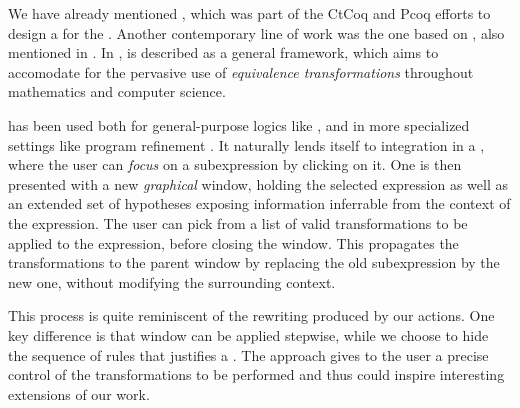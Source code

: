 \begin{scope}
We have already mentioned , which was part of the CtCoq and
Pcoq efforts  to design a  for the  . Another contemporary line of work was the
one based on \emph{}, also mentioned in . In
,  is described as a general
 framework, which aims to accomodate for the pervasive use of
\emph{equivalence transformations} throughout mathematics and computer science.

 has been used both for general-purpose logics like 
, and in more specialized settings like program
refinement . It naturally lends itself to
integration in a 
, where the user can
\emph{focus} on a subexpression by clicking on it. One is then presented with a
new \emph{graphical} window, holding the selected expression as well as an
extended set of hypotheses exposing information inferrable from the context of
the expression. The user can pick from a list of valid transformations to be
applied to the expression, before closing the window. This propagates the
transformations to the parent window by replacing the old subexpression by the
new one, without modifying the surrounding context.

This process is quite reminiscent of the rewriting produced by our 
actions. One key difference is that window  can be
applied stepwise, while we choose to hide the sequence of rules that
justifies a . The  approach gives to the user a
precise control of the transformations to be performed and thus could
inspire interesting extensions of our work.


\end{scope}
